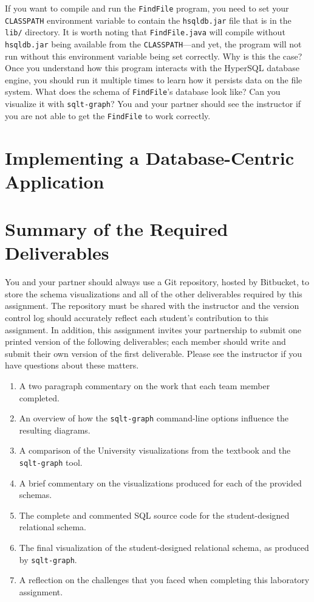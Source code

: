 If you want to compile and run the {\tt FindFile} program, you need to set your {\tt CLASSPATH} environment variable to
contain the {\tt hsqldb.jar} file that is in the {\tt lib/} directory. It is worth noting that {\tt FindFile.java} will
compile without {\tt hsqldb.jar} being available from the {\tt CLASSPATH}---and yet, the program will not run without
this environment variable being set correctly.  Why is this the case? Once you understand how this program interacts
with the HyperSQL database engine, you should run it multiple times to learn how it persists data on the file system.
What does the schema of {\tt FindFile}'s database look like? Can you visualize it with {\tt sqlt-graph}? You and your
partner should see the instructor if you are not able to get the {\tt FindFile} to work correctly.

\vspace*{-.05in}
\section*{Implementing a Database-Centric Application}



\section*{Summary of the Required Deliverables}

You and your partner should always use a Git repository, hosted by Bitbucket, to store the schema visualizations and
all of the other deliverables required by this assignment. The repository must be shared with the instructor and
the version control log should accurately reflect each student's contribution to this assignment. In addition, this
assignment invites your partnership to submit one printed version of the following deliverables; each member should
write and submit their own version of the first deliverable. Please see the instructor if you have questions about
these matters.


\begin{enumerate}
  \setlength{\itemsep}{0pt}
  \item A two paragraph commentary on the work that each team member completed. 
  \item An overview of how the {\tt sqlt-graph} command-line options influence the resulting diagrams.
  \item A comparison of the University visualizations from the textbook and the {\tt sqlt-graph} tool.
  \item A brief commentary on the visualizations produced for each of the provided schemas.
  \item The complete and commented SQL source code for the student-designed relational schema.
  \item The final visualization of the student-designed relational schema, as produced by {\tt sqlt-graph}.
  \item A reflection on the challenges that you faced when completing this laboratory assignment.
\end{enumerate}

